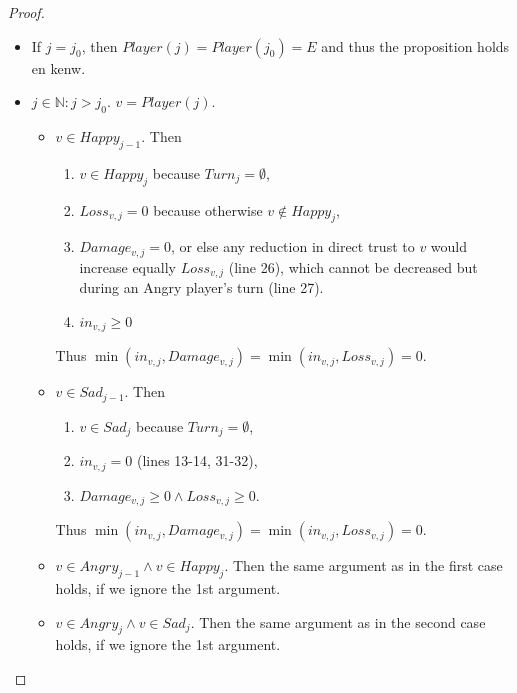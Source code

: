 \documentclass[11pt]{article}
\theoremstyle{definition}
\theoremstyle{corollary}
\theoremstyle{lemma}
\begin{document}
    \begin{proof} \ 
       \begin{itemize}
          \item If $j = j_0$, then $Player(j) = Player(j_0) = E$ and thus the proposition holds en kenw.
          \item $j \in \mathbb{N}: j > j_0$. $v = Player(j)$.
          \begin{itemize}
             \item $v \in Happy_{j-1}$. Then
             \begin{enumerate}
                \item $v \in Happy_j$ because $Turn_{j} = \emptyset$,
                \item $Loss_{v, j} = 0$ because otherwise $v \notin Happy_j$,
                \item $Damage_{v, j} = 0$, or else any reduction in direct trust to $v$ would increase equally
                $Loss_{v, j}$ (line 26), which cannot be decreased but during an Angry player's turn (line 27).
                \item $in_{v, j} \geq 0$
             \end{enumerate}
             Thus $\min(in_{v, j}, Damage_{v,j}) = \min(in_{v, j}, Loss_{v,j}) = 0$.
             \item $v \in Sad_{j-1}$. Then
             \begin{enumerate}
                \item $v \in Sad_j$ because $Turn_{j} = \emptyset$, 
                \item $in_{v, j} = 0$ (lines 13-14, 31-32),
                \item $Damage_{v, j} \geq 0 \wedge Loss_{v, j} \geq 0$.
             \end{enumerate}
             Thus $\min(in_{v, j}, Damage_{v,j}) = \min(in_{v, j}, Loss_{v,j}) = 0$.
             \item $v \in Angry_{j-1} \wedge v \in Happy_j$. Then the same argument as in the first case holds, if
             we ignore the 1st argument.
             \item $v \in Angry_j \wedge v \in Sad_j$. Then the same argument as in the second case holds, if 
             we ignore the 1st argument.
          \end{itemize}
       \end{itemize}
    \end{proof}
\end{document}
